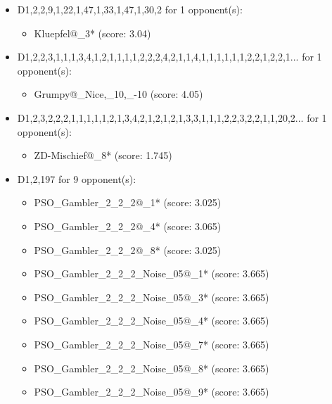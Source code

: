 \begin{appendices}
\begin{itemize}
    \item D1,2,2,9,1,22,1,47,1,33,1,47,1,30,2 for 1 opponent(s):
    \begin{multicols}{3}
         \begin{itemize}
            \item Kluepfel@\_3* (score: 3.04)
        \end{itemize}
     \end{multicols}
     
    \item D1,2,2,3,1,1,1,3,4,1,2,1,1,1,1,2,2,2,4,2,1,1,4,1,1,1,1,1,1,2,2,1,2,2,1... for 1 opponent(s):
    \begin{multicols}{3}
         \begin{itemize}
            \item Grumpy@\_Nice,\_10,\_-10 (score: 4.05)
        \end{itemize}
     \end{multicols}
     
    \item D1,2,3,2,2,2,1,1,1,1,1,2,1,3,4,2,1,2,1,2,1,3,3,1,1,1,2,2,3,2,2,1,1,20,2... for 1 opponent(s):
    \begin{multicols}{3}
         \begin{itemize}
            \item ZD-Mischief@\_8* (score: 1.745)
        \end{itemize}
     \end{multicols}
     
    \item D1,2,197 for 9 opponent(s):
    \begin{multicols}{3}
         \begin{itemize}
            \item PSO\_Gambler\_2\_2\_2@\_1* (score: 3.025)
            \item PSO\_Gambler\_2\_2\_2@\_4* (score: 3.065)
            \item PSO\_Gambler\_2\_2\_2@\_8* (score: 3.025)
            \item PSO\_Gambler\_2\_2\_2\_Noise\_05@\_1* (score: 3.665)
            \item PSO\_Gambler\_2\_2\_2\_Noise\_05@\_3* (score: 3.665)
            \item PSO\_Gambler\_2\_2\_2\_Noise\_05@\_4* (score: 3.665)
            \item PSO\_Gambler\_2\_2\_2\_Noise\_05@\_7* (score: 3.665)
            \item PSO\_Gambler\_2\_2\_2\_Noise\_05@\_8* (score: 3.665)
            \item PSO\_Gambler\_2\_2\_2\_Noise\_05@\_9* (score: 3.665)
        \end{itemize}
     \end{multicols}
     

\end{itemize}
\end{appendices}
